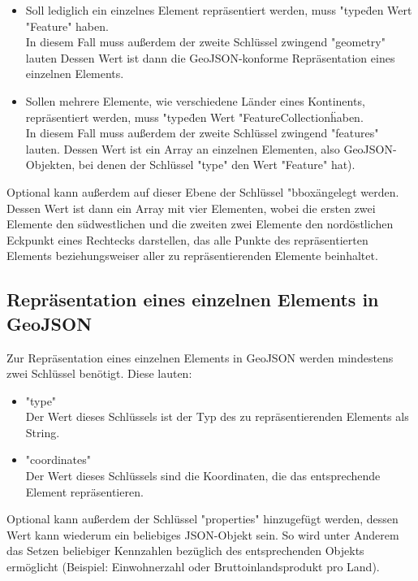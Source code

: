 \begin{itemize}
    \item Soll lediglich ein einzelnes Element repräsentiert werden, muss "type\" den Wert "Feature" haben.
            \\ In diesem Fall muss außerdem der zweite Schlüssel zwingend "geometry" lauten Dessen Wert ist dann die GeoJSON-konforme Repräsentation eines einzelnen Elements.
    \item Sollen mehrere Elemente, wie verschiedene Länder eines Kontinents, repräsentiert werden, muss "type\" den Wert "FeatureCollection\" haben.
            \\ In diesem Fall muss außerdem der zweite Schlüssel zwingend "features" lauten. Dessen Wert ist ein Array an einzelnen Elementen, also GeoJSON-Objekten, bei denen der Schlüssel "type" den Wert "Feature" hat).
\end{itemize}

Optional kann außerdem auf dieser Ebene der Schlüssel "bbox\" angelegt werden. Dessen Wert ist dann ein Array mit vier Elementen, wobei die ersten zwei Elemente den südwestlichen und die zweiten zwei Elemente den nordöstlichen Eckpunkt eines Rechtecks darstellen, das alle Punkte des repräsentierten Elements beziehungsweiser aller zu repräsentierenden Elemente beinhaltet.

\subsection{Repräsentation eines einzelnen Elements in GeoJSON}

Zur Repräsentation eines einzelnen Elements in GeoJSON werden mindestens zwei Schlüssel benötigt. Diese lauten:

\begin{itemize}
    \item "type"
            \\ Der Wert dieses Schlüssels ist der Typ des zu repräsentierenden Elements als String.
    \item "coordinates"
            \\ Der Wert dieses Schlüssels sind die Koordinaten, die das entsprechende Element repräsentieren.
\end{itemize}

Optional kann außerdem der Schlüssel "properties" hinzugefügt werden, dessen Wert kann wiederum ein beliebiges JSON-Objekt sein. So wird unter Anderem das Setzen beliebiger Kennzahlen bezüglich des entsprechenden Objekts ermöglicht (Beispiel: Einwohnerzahl oder Bruttoinlandsprodukt pro Land).

